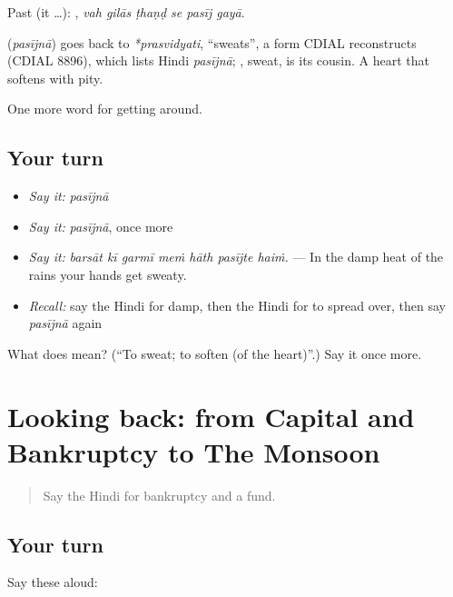 Past (it …):      , \emph{vah gilās ṭhaṇḍ se pasīj gayā}.

\begin{cousinweb}
\textbf{} (\emph{pasījnā}) goes back to \emph{*prasvidyati}, \textquotedblleft{}sweats\textquotedblright{}, a form CDIAL reconstructs (CDIAL 8896), which lists Hindi \emph{pasījnā}; , sweat, is its cousin. A heart that  softens with pity.
\end{cousinweb}

\begin{grammarlens}[title={What you've built}]
One more word for getting around.
\end{grammarlens}

\subsection*{Your turn}
\begin{itemize}
\raggedright
  \item \emph{Say it:} \emph{pasījnā}
  \item \emph{Say it:} \emph{pasījnā}, once more
  \item \emph{Say it:} \emph{barsāt kī garmī meṁ hāth pasījte haiṁ.} — In the damp heat of the rains your hands get sweaty.
  \item \emph{Recall:} say the Hindi for damp, then the Hindi for to spread over, then say \emph{pasījnā} again
\end{itemize}

\begin{tcolorbox}[breakable,colback=teal!4,colframe=teal!35!black,title={Before you move on}]
What does  mean? (\textquotedblleft{}To sweat; to soften (of the heart)\textquotedblright{}.) Say it once more.
\end{tcolorbox}
\section[(dialogue)]{Looking back: from Capital and Bankruptcy to The Monsoon}

\label{lesson:HI-R437-review-430-437}



\begin{quote}
Say the Hindi for bankruptcy and a fund.
\end{quote}

\subsection*{Your turn}
Say these aloud:

